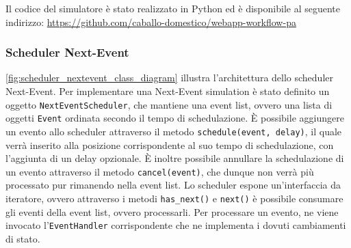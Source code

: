 Il codice del simulatore è stato realizzato in Python ed è disponibile al seguente indirizzo: \url{https://github.com/caballo-domestico/webapp-workflow-pa}

\subsubsection{Scheduler Next-Event}
\autoref{fig:scheduler_nextevent_class_diagram} illustra l'architettura dello scheduler Next-Event. Per implementare una Next-Event simulation è stato definito un oggetto \texttt{NextEventScheduler}, che mantiene una event list, ovvero una lista di oggetti \texttt{Event} ordinata secondo il tempo di schedulazione. È possibile aggiungere un evento allo scheduler attraverso il metodo \texttt{schedule(event, delay)}, il quale verrà inserito alla posizione corrispondente al suo tempo di schedulazione, con l'aggiunta di un delay opzionale. È inoltre possibile annullare la schedulazione di un evento attraverso il metodo \texttt{cancel(event)}, che dunque non verrà più processato pur rimanendo nella event list. Lo scheduler espone un'interfaccia da iteratore, ovvero attraverso i metodi \texttt{has\_next()} e \texttt{next()} è possibile consumare gli eventi della event list, ovvero processarli. Per processare un evento, ne viene invocato l'\texttt{EventHandler} corrispondente che ne implementa i dovuti cambiamenti di stato.

